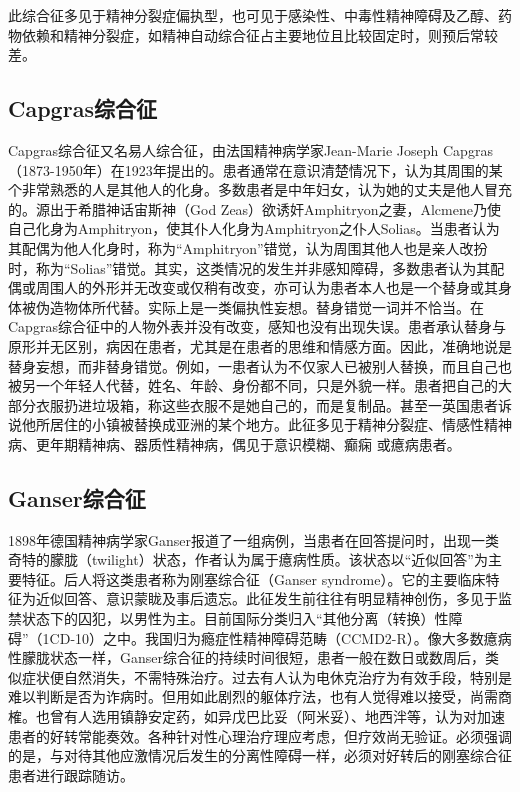 此综合征多见于精神分裂症偏执型，也可见于感染性、中毒性精神障碍及乙醇、药物依赖和精神分裂症，如精神自动综合征占主要地位且比较固定时，则预后常较差。

\subsection{Capgras综合征}

Capgras综合征又名易人综合征，由法国精神病学家Jean-Marie Joseph
Capgras（1873-1950年）在1923年提出的。患者通常在意识清楚情况下，认为其周围的某个非常熟悉的人是其他人的化身。多数患者是中年妇女，认为她的丈夫是他人冒充的。源出于希腊神话宙斯神（God
Zeas）欲诱奸Amphitryon之妻，Alcmene乃使自己化身为Amphitryon，使其仆人化身为Amphitryon之仆人Solias。当患者认为其配偶为他人化身时，称为``Amphitryon''错觉，认为周围其他人也是亲人改扮时，称为``Solias''错觉。其实，这类情况的发生并非感知障碍，多数患者认为其配偶或周围人的外形并无改变或仅稍有改变，亦可认为患者本人也是一个替身或其身体被伪造物体所代替。实际上是一类偏执性妄想。替身错觉一词并不恰当。在Capgras综合征中的人物外表并没有改变，感知也没有出现失误。患者承认替身与原形并无区别，病因在患者，尤其是在患者的思维和情感方面。因此，准确地说是替身妄想，而非替身错觉。例如，一患者认为不仅家人已被别人替换，而且自己也被另一个年轻人代替，姓名、年龄、身份都不同，只是外貌一样。患者把自己的大部分衣服扔进垃圾箱，称这些衣服不是她自己的，而是复制品。甚至一英国患者诉说他所居住的小镇被替换成亚洲的某个地方。此征多见于精神分裂症、情感性精神病、更年期精神病、器质性精神病，偶见于意识模糊、癫痫
或癔病患者。

\subsection{Ganser综合征}

1898年德国精神病学家Ganser报道了一组病例，当患者在回答提问时，出现一类奇特的朦胧（twilight）状态，作者认为属于癔病性质。该状态以``近似回答''为主要特征。后人将这类患者称为刚塞综合征（Ganser
syndrome）。它的主要临床特征为近似回答、意识蒙眬及事后遗忘。此征发生前往往有明显精神创伤，多见于监禁状态下的囚犯，以男性为主。目前国际分类归入``其他分离（转换）性障碍''（1CD-10）之中。我国归为瘾症性精神障碍范畴（CCMD2-R）。像大多数癔病性朦胧状态一样，Ganser综合征的持续时间很短，患者一般在数日或数周后，类似症状便自然消失，不需特殊治疗。过去有人认为电休克治疗为有效手段，特别是难以判断是否为诈病时。但用如此剧烈的躯体疗法，也有人觉得难以接受，尚需商榷。也曾有人选用镇静安定药，如异戊巴比妥（阿米妥）、地西泮等，认为对加速患者的好转常能奏效。各种针对性心理治疗理应考虑，但疗效尚无验证。必须强调的是，与对待其他应激情况后发生的分离性障碍一样，必须对好转后的刚塞综合征患者进行跟踪随访。


